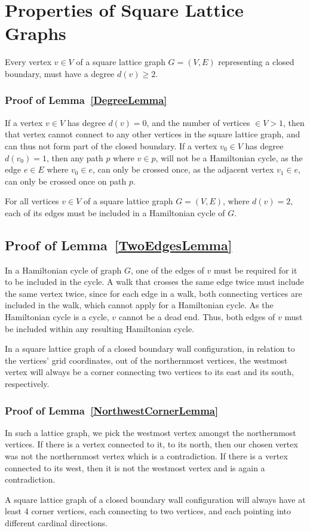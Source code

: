 \section{Properties of Square Lattice Graphs}
\begin{lemma}
Every vertex $v\in V$ of a square lattice graph $G=(V,E)$ representing a closed boundary, must have a degree $d(v)\geq 2$.\label{DegreeLemma}
\end{lemma}
\subsubsection*{Proof of Lemma~\ref{DegreeLemma}}
If a vertex $v\in V$ has degree $d(v)=0$, and the number of vertices $\in V>1$, then that vertex cannot connect to any other vertices in the square lattice graph, and can thus not form part of the closed boundary. If a vertex $v_0\in V$ has degree $d(v_0)=1$, then any path $p$ where $v\in p$, will not be a Hamiltonian cycle, as the edge $e\in E$ where $v_0\in e$, can only be crossed once, as the adjacent vertex $v_1\in e$, can only be crossed once on path $p$.\autocite{myself}
\begin{lemma}
For all vertices $v\in V$ of a square lattice graph $G=(V,E)$, where $d(v)=2$, each of its edges must be included in a Hamiltonian cycle of $G$.\label{TwoEdgesLemma}
\end{lemma}
\subsection*{Proof of Lemma~\ref{TwoEdgesLemma}}
In a Hamiltonian cycle of graph $G$, one of the edges of $v$ must be required for it to be included in the cycle. A walk that crosses the same edge twice must include the same vertex twice, since for each edge in a walk, both connecting vertices are included in the walk, which cannot apply for a Hamiltonian cycle. As the Hamiltonian cycle is a cycle, $v$ cannot be a dead end. Thus, both edges of $v$ must be included within any resulting Hamiltonian cycle.
\begin{lemma}
In a square lattice graph of a closed boundary wall configuration, in relation to the vertices' grid coordinates, out of the northernmost vertices, the westmost vertex will always be a corner connecting two vertices to its east and its south, respectively.\label{NorthwestCornerLemma}
\end{lemma}
\subsubsection*{Proof of Lemma~\ref{NorthwestCornerLemma}}
In such a lattice graph, we pick the westmost vertex amongst the northernmost vertices. If there is a vertex connected to it, to its north, then our chosen vertex was not the northernmost vertex which is a contradiction. If there is a vertex connected to its west, then it is not the westmost vertex and is again a contradiction.\autocite{myself}
\begin{conjecture}
A square lattice graph of a closed boundary wall configuration will always have at least 4 corner vertices, each connecting to two vertices, and each pointing into different cardinal directions.\label{FourCornerLemma}
\end{conjecture}
